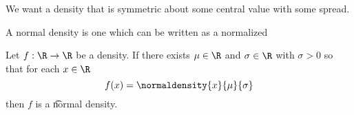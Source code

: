 

We want a density that is symmetric about some central value with some spread.


A normal density is one which can be written as a normalized

Let $f: \R \to \R$ be a density.
If there exists $\mu \in \R$ and $\sigma \in \R$ with $\sigma > 0$ so that for each $x \in \R$
\[
  f(x) = \normaldensity{x}{\mu}{\sigma}
\]
then $f$ is a \t{normal density}.
